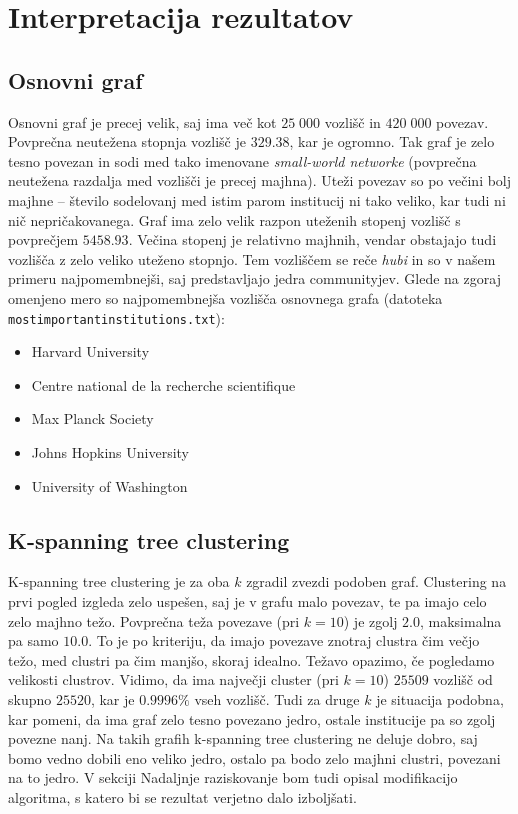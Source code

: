 \documentclass[a4paper,12pt]{article}
\begin{document}
	\section{Interpretacija rezultatov}	
	\subsection{Osnovni graf}
	
	Osnovni graf je precej velik, saj ima več kot $25\; 000$ vozlišč in $420\; 000$ povezav. Povprečna neutežena stopnja vozlišč je $329.38$, kar je ogromno. Tak graf je zelo tesno povezan in sodi med tako imenovane \textit{small-world networke} (povprečna neutežena razdalja med vozlišči je precej majhna). Uteži povezav so po večini bolj majhne -- število sodelovanj med istim parom institucij ni tako veliko, kar tudi ni nič nepričakovanega. Graf ima zelo velik razpon uteženih stopenj vozlišč s povprečjem $5458.93$. Večina stopenj je relativno majhnih, vendar obstajajo tudi vozlišča z zelo veliko uteženo stopnjo. Tem vozliščem se reče \textit{hubi} in so v našem primeru najpomembnejši, saj predstavljajo jedra communityjev. Glede na zgoraj omenjeno mero so najpomembnejša vozlišča osnovnega grafa (datoteka \texttt{most\textunderscore important\textunderscore institutions.txt}):
	\begin{itemize}
		\item Harvard University
		\item Centre national de la recherche scientifique
		\item Max Planck Society
		\item Johns Hopkins University
		\item University of Washington		
	\end{itemize}
	
	\subsection{K-spanning tree clustering}
	K-spanning tree clustering je za oba $k$ zgradil zvezdi podoben graf. Clustering na prvi pogled izgleda zelo uspešen, saj je v grafu malo povezav, te pa imajo celo zelo majhno težo. Povprečna teža povezave (pri $k = 10$) je zgolj $2.0$, maksimalna pa samo $10.0$. To je po kriteriju, da imajo povezave znotraj clustra čim večjo težo, med clustri pa čim manjšo, skoraj idealno.
	Težavo opazimo, če pogledamo velikosti clustrov. Vidimo, da ima največji cluster (pri $k = 10$) $25509$ vozlišč od skupno $25520$, kar je $0.9996\%$ vseh vozlišč. Tudi za druge $k$ je situacija podobna, kar pomeni, da ima graf zelo tesno povezano jedro, ostale institucije pa so zgolj povezne nanj. Na takih grafih k-spanning tree clustering ne deluje dobro, saj bomo vedno dobili eno veliko jedro, ostalo pa bodo zelo majhni clustri, povezani na to jedro. V sekciji Nadaljnje raziskovanje bom tudi opisal modifikacijo algoritma, s katero bi se rezultat verjetno dalo izboljšati.
	
\end{document}

